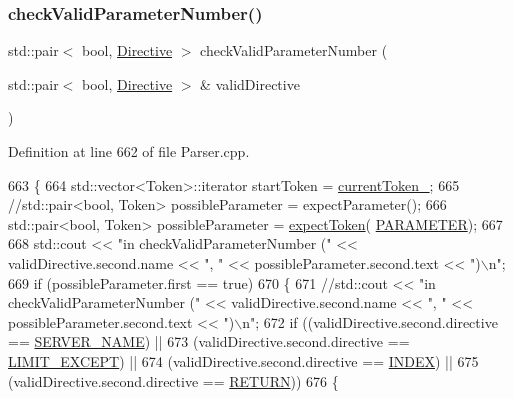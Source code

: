 \subsubsection{\texorpdfstring{check\+Valid\+Parameter\+Number()}{checkValidParameterNumber()}}
{\footnotesize\ttfamily std\+::pair$<$ bool, \hyperlink{classft_1_1_directive}{Directive} $>$ check\+Valid\+Parameter\+Number (\begin{DoxyParamCaption}\item[{std\+::pair$<$ bool, \hyperlink{classft_1_1_directive}{Directive} $>$ \&}]{valid\+Directive }\end{DoxyParamCaption})}



Definition at line 662 of file Parser.\+cpp.


\begin{DoxyCode}
663     \{
664         std::vector<Token>::iterator startToken = \hyperlink{classft_1_1_parser_a942c5b794d108f144c5b5028aaa34cb6}{currentToken\_};
665         \textcolor{comment}{//std::pair<bool, Token> possibleParameter = expectParameter();}
666         std::pair<bool, Token> possibleParameter = \hyperlink{classft_1_1_parser_a1615a752d3642bb53598e2c8db810db0}{expectToken}(
      \hyperlink{namespaceft_aa520fbf142ba1e7e659590c07da31921a194cde856bd2d79eac8adb9741c55940}{PARAMETER});
667 
668         std::cout << \textcolor{stringliteral}{"in checkValidParameterNumber ("} << validDirective.second.name << \textcolor{stringliteral}{", "} << 
      possibleParameter.second.text << \textcolor{stringliteral}{")\(\backslash\)n"};
669         \textcolor{keywordflow}{if} (possibleParameter.first == \textcolor{keyword}{true})
670         \{
671             \textcolor{comment}{//std::cout << "in checkValidParameterNumber (" << validDirective.second.name << ", " <<
       possibleParameter.second.text << ")\(\backslash\)n";}
672             \textcolor{keywordflow}{if} ((validDirective.second.directive == \hyperlink{namespaceft_a5a5554dff10f0dc50bae4cc5825ad75da8e7adb687472b53e3ed632cbcb949d88}{SERVER\_NAME}) ||
673                     (validDirective.second.directive == \hyperlink{namespaceft_a5a5554dff10f0dc50bae4cc5825ad75da25b0e84438d71cc28e97f17a01cfde7a}{LIMIT\_EXCEPT}) ||
674                     (validDirective.second.directive == \hyperlink{namespaceft_a5a5554dff10f0dc50bae4cc5825ad75da5f0c05bad71a7b0dd266aae7ce4b3579}{INDEX}) ||
675                     (validDirective.second.directive == \hyperlink{namespaceft_a5a5554dff10f0dc50bae4cc5825ad75da520e09ffec033636dba711f3441cc600}{RETURN}))
676             \{

\end{DoxyCode}
